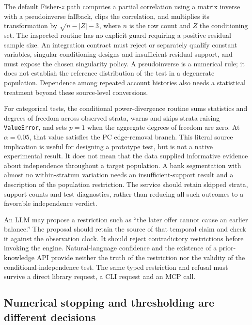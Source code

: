 The default Fisher-$z$ path computes a partial correlation using a matrix inverse
with a pseudoinverse fallback, clips the correlation, and multiplies its
transformation by $\sqrt{n-|Z|-3}$, where $n$ is the row count and $Z$ the
conditioning set. The inspected routine has no explicit guard requiring a
positive residual sample size. An integration contract must reject or separately
qualify constant variables, singular conditioning designs and insufficient
residual support, and must expose the chosen singularity policy. A pseudoinverse
is a numerical rule; it does not establish the reference distribution of the
test in a degenerate population. Dependence among repeated account histories
also needs a statistical treatment beyond these source-level conversions.
\citep{exec20_gcastle_source}

For categorical tests, the conditional power-divergence routine sums statistics
and degrees of freedom across observed strata, warns and skips strata raising
\texttt{ValueError}, and sets $p=1$ when the aggregate degrees of freedom are
zero. At $\alpha=0.05$, that value satisfies the PC edge-removal branch. This
literal source implication is useful for designing a prototype test, but is not
a native experimental result. It does not mean that the data supplied informative
evidence about independence throughout a target population. A bank segmentation
with almost no within-stratum variation needs an insufficient-support result
and a description of the population restriction. The service should retain
skipped strata, support counts and test diagnostics, rather than reducing all
such outcomes to a favorable independence verdict.
\citep{exec20_gcastle_source,exec20_gcastle_reference}

An LLM may propose a restriction such as ``the later offer cannot cause an earlier
balance.'' The proposal should retain the source of that temporal claim and
check it against the observation clock. It should reject contradictory
restrictions before invoking the engine. Natural-language confidence and the
existence of a prior-knowledge API provide neither the truth of the restriction
nor the validity of the conditional-independence test. The same typed restriction
and refusal must survive a direct library request, a CLI request and an MCP call.

\subsection{Numerical stopping and thresholding are different decisions}
\label{exec20:gcastle-numerics}

